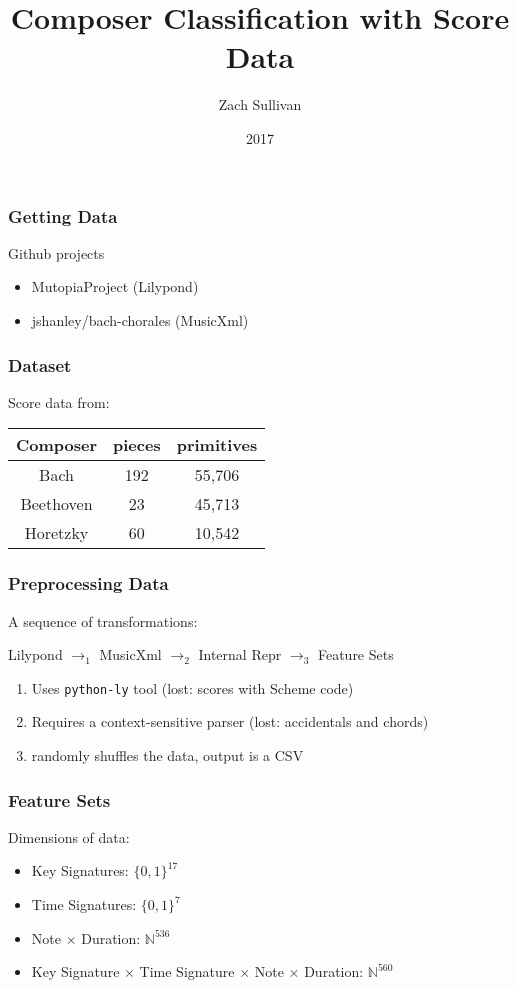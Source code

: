 \documentclass{beamer}
\title{Composer Classification with Score Data}
\author{Zach Sullivan}
\date{2017}
\begin{document}
\frame{\titlepage}

\begin{frame}
\frametitle{Getting Data}
Github projects
\begin{itemize}
\item MutopiaProject (Lilypond)
\item jshanley/bach-chorales (MusicXml)
\end{itemize}
\end{frame}

\begin{frame}
  \frametitle{Dataset}
  Score data from:
  \vspace{1em}

  \begin{center}
  \begin{tabular}{c | c c}
    Composer & pieces & primitives\\
    \hline
    Bach & 192 & 55,706 \\
    Beethoven & 23 & 45,713 \\
    Horetzky &  60 & 10,542 \\
  \end{tabular}
  \end{center}
\end{frame}

\begin{frame}
  \frametitle{Preprocessing Data}

  A sequence of transformations:

  \begin{center}
    Lilypond
    $\rightarrow_1$ MusicXml
    $\rightarrow_2$ Internal Repr
    $\rightarrow_3$ Feature Sets
  \end{center}

  \begin{enumerate}
    \item Uses {\tt python-ly} tool (lost: scores with Scheme code)
    \item Requires a context-sensitive parser (lost: accidentals and chords)
    \item randomly shuffles the data, output is a CSV
  \end{enumerate}
\end{frame}

\begin{frame}
  \frametitle{Feature Sets}
  Dimensions of data:
  \begin{itemize}
  \item Key Signatures: $\{0,1\}^{17}$
  \item Time Signatures: $\{0,1\}^{7}$
  \item Note $\times$ Duration: $\mathbb{N}^{536}$
  \item Key Signature
    $\times$ Time Signature
    $\times$ Note
    $\times$ Duration:
    $\mathbb{N}^{560}$
  \end{itemize}
\end{frame}
\end{document}
